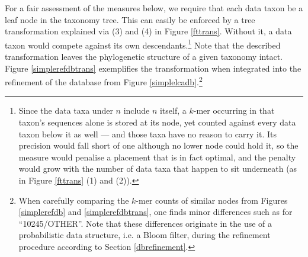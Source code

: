 \documentclass[pdflatex,sn-vancouver-num]{sn-jnl}
\begin{document}
For a fair assessment of the measures below, we require that each data taxon be a leaf node in the taxonomy tree. This can easily be enforced by a tree transformation explained via (3) and (4) in Figure \ref{fttrans}. Without it, a data taxon would compete against its own descendants.\footnote{Since the data taxa under $n$ include $n$ itself, a $k$-mer occurring in that taxon's sequences alone is stored at its node, yet counted against every data taxon below it as well --- and those taxa have no reason to carry it. Its precision would fall short of one although no lower node could hold it, so the measure would penalise a placement that is in fact optimal, and the penalty would grow with the number of data taxa that happen to sit underneath (as in Figure \ref{fttrans} (1) and (2)).} Note that the described transformation leaves the phylogenetic structure of a given taxonomy intact.
Figure \ref{simplerefdbtrans} exemplifies the transformation when integrated into the refinement of the database from Figure \ref{simplelcadb}.\footnote{When carefully comparing the $k$-mer counts of similar nodes from Figures \ref{simplerefdb} and \ref{simplerefdbtrans}, one finds minor differences such as for \enquote{10245/OTHER}. Note that these differences originate in the use of a probabilistic data structure, i.e. a Bloom filter, during the refinement procedure according to Section \ref{dbrefinement}.}
\end{document}

